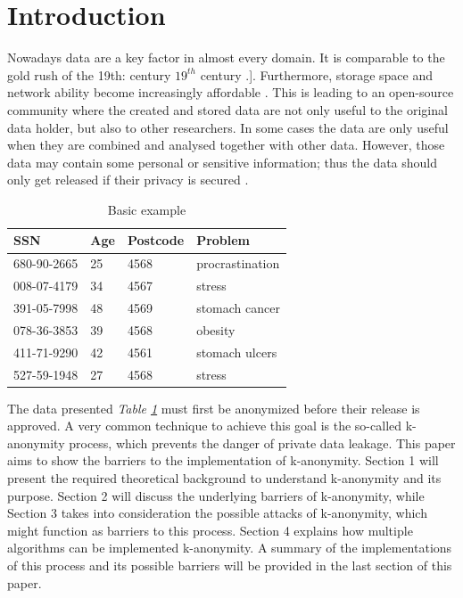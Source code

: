 \documentclass{llncs}
\begin{document}
\section{Introduction}
%
Nowadays data are a key factor in almost every domain. It is comparable to the gold rush of the 19th: century $19^{th}$ century \cite{datarevo}.]. Furthermore, storage space and network ability become increasingly affordable \cite{sweeney2002k}. 
This is leading to an open-source community where the created and stored data are not only useful to the original data holder, but also to other researchers. In some cases the data are only useful when they are combined and analysed together with other data. However, those data may contain some personal or sensitive information; thus the data should only get released if their privacy is secured  \cite{li2006achieving}.\\
\begin{table}[]
	\centering
	\caption{Basic example}
	\label{intro_example}
	\begin{tabular}{@{}llll@{}}
		\toprule
		SSN         & Age & Postcode & Problem         \\ \midrule
		680-90-2665 & 25  & 4568     & procrastination \\
		008-07-4179 & 34  & 4567     & stress          \\
		391-05-7998 & 48  & 4569     & stomach cancer  \\
		078-36-3853 & 39  & 4568     & obesity         \\
		411-71-9290 & 42  & 4561     & stomach ulcers  \\
		527-59-1948 & 27  & 4568     & stress          \\ \bottomrule
	\end{tabular}
\end{table}

The data presented \textit{Table \ref{intro_example}} must first be anonymized before their release is approved. A very common technique to achieve this goal is the so-called k-anonymity process, which prevents the danger of private data leakage. This paper aims to show the barriers to the implementation of k-anonymity. Section 1 will present the required theoretical background to understand k-anonymity and its purpose. Section 2 will discuss the underlying barriers of k-anonymity, while Section 3 takes into consideration the possible attacks of k-anonymity, which might function as barriers to this process. Section 4 explains how multiple algorithms can be implemented k-anonymity. A summary of the implementations of this process and its possible barriers  will be provided in the last section of this paper.
\newpage
\end{document}
